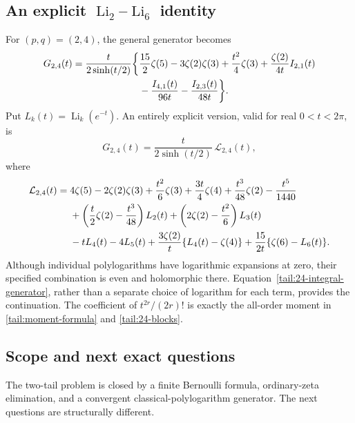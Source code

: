 \documentclass[11pt,a4paper]{article}
\numberwithin{equation}{section}
\theoremstyle{definition}
\theoremstyle{remark}
\begin{document}
\subsection{An explicit \texorpdfstring{$\operatorname{Li}_2$--$\operatorname{Li}_6$}{Li2--Li6} identity}

For \((p,q)=(2,4)\), the general generator becomes
\begin{align}\label{tail:24-integral-generator}
 G_{2,4}(t)=\frac{t}{2\sinh(t/2)}\bigg\{
 &\frac{15}{2}\zeta(5)-3\zeta(2)\zeta(3)
       +\frac{t^2}{4}\zeta(3)
       +\frac{\zeta(2)}{4t}I_{2,1}(t)\notag\\
 &-\frac{I_{4,1}(t)}{96t}
       -\frac{I_{2,3}(t)}{48t}\bigg\}.
\end{align}
Put \(L_k(t)=\operatorname{Li}_k(e^{-t})\). An entirely explicit
version, valid for real \(0<t<2\pi\), is
\begin{equation}\label{tail:24-Li-generator}
 G_{2,4}(t)=\frac{t}{2\sinh(t/2)}\,\mathcal L_{2,4}(t),
\end{equation}
where
\begin{align}\label{tail:24-Li-body}
 \mathcal L_{2,4}(t)={}&4\zeta(5)-2\zeta(2)\zeta(3)
       +\frac{t^2}{6}\zeta(3)+\frac{3t}{4}\zeta(4)
       +\frac{t^3}{48}\zeta(2)-\frac{t^5}{1440}\notag\\
 &+\left(\frac{t}{2}\zeta(2)-\frac{t^3}{48}\right)L_2(t)
       +\left(2\zeta(2)-\frac{t^2}{6}\right)L_3(t)\notag\\
 &-tL_4(t)-4L_5(t)
       +\frac{3\zeta(2)}{t}\{L_4(t)-\zeta(4)\}
       +\frac{15}{2t}\{\zeta(6)-L_6(t)\}.
\end{align}
Although individual polylogarithms have logarithmic expansions at
zero, their specified combination is even and holomorphic there.
Equation~\eqref{tail:24-integral-generator}, rather than a separate
choice of logarithm for each term, provides the continuation. The
coefficient of \(t^{2r}/(2r)!\) is exactly the all-order moment in
\eqref{tail:moment-formula} and \eqref{tail:24-blocks}.

\subsection{Scope and next exact questions}

The two-tail problem is closed by a finite Bernoulli formula,
ordinary-zeta elimination, and a convergent classical-polylogarithm
generator. The next questions are structurally different.
\end{document}

